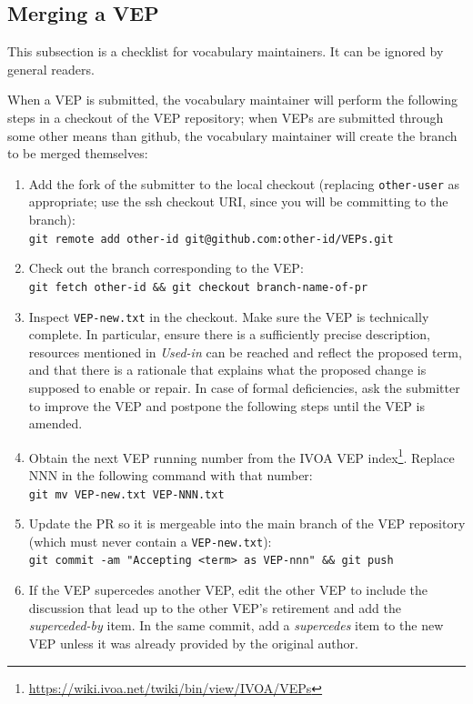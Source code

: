 \documentclass[11pt,a4paper]{ivoa}
\newcommand{\vepitem}[1]{\emph{#1}}
\begin{document}
\subsection{Merging a VEP}

This subsection is a checklist for vocabulary maintainers.  It can be
ignored by general readers.

When a VEP is submitted, the vocabulary maintainer will perform the
following steps in a checkout of the VEP repository; when VEPs are
submitted through some other means than github, the vocabulary
maintainer will create the branch to be merged themselves:

\begin{enumerate}
\item Add the fork of the submitter to the local checkout (replacing
\verb|other-user| as appropriate; use the ssh checkout URI, since you
will be committing to the branch):\\
\verb|git remote add other-id git@github.com:other-id/VEPs.git|

\item Check out the branch corresponding to the VEP:\\
\verb|git fetch other-id && git checkout branch-name-of-pr|

\item Inspect \verb|VEP-new.txt| in the checkout.  Make sure the VEP is
technically complete.  In particular, ensure there is a sufficiently
precise description, resources mentioned in \vepitem{Used-in} can be reached
and reflect the proposed term, and that there is a rationale that
explains what the proposed change is supposed to enable or repair.  In
case of formal deficiencies, ask the submitter to improve the VEP and
postpone the following steps until the VEP is amended.

\item Obtain the next VEP running number from the IVOA VEP
index\footnote{\url{https://wiki.ivoa.net/twiki/bin/view/IVOA/VEPs}}.
Replace NNN in the following command with that number:\\
\verb|git mv VEP-new.txt VEP-NNN.txt|

\item Update the PR so it is mergeable into the main branch of the VEP
repository (which must never contain a \verb|VEP-new.txt|):\\
\verb|git commit -am "Accepting <term> as VEP-nnn" && git push|

\item If the VEP supercedes another VEP, edit the other VEP to include
the discussion that lead up to the other VEP's retirement and add the
\vepitem{superceded-by} item.  In the same commit, add a
\vepitem{supercedes} item to the new VEP unless it was already provided
by the original author.


\end{enumerate}
\end{document}
